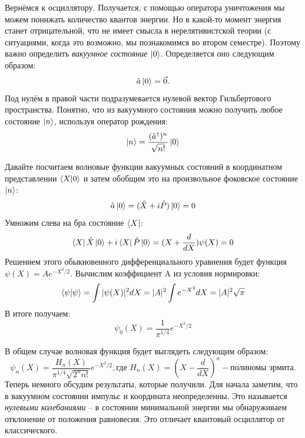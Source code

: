 Вернёмся к осциллятору. Получается, с помощью оператора уничтожения мы можем понижать количество квантов энергии. Но в какой-то момент энергия станет отрицательной, что не имеет смысла в нерелятивистской теории (с ситуациями, когда это возможно, мы познакомимся во втором семестре). Поэтому важно определить \textit{вакуумное состояние} $\ket{0}$. Определяется оно следующим образом:
\[
\hat{a}\ket{0} = \vec 0.
\]
Под нулём в правой части подразумевается нулевой вектор Гильбертового пространства. Понятно, что из вакуумного состояния можно получить любое состояние $\ket{n}$, используя оператор рождения:
\[
\ket{n} = \frac{(\hat{a}^{\dagger})^n}{\sqrt{n!}}\ket{0}
\]

Давайте посчитаем волновые функции вакуумных состояний в координатном представлении $\bra{X}\ket{0}$ и затем обобщим это на произвольное фоковское состояние $\ket{n}$:
\[
\hat{a}\ket{0} = (\hat{X} + i\hat{P})\ket{0} = 0
\]
Умножим слева на бра состояние $\bra{X}$:
\[
\bra{X}\hat{X}\ket{0} + i\bra{X}\hat{P}\ket{0} = (X + \frac{d}{dX})\psi(X) = 0
\]
Решением этого обыкновенного дифференциального уравнения будет функция $\psi(X) = Ae^{-X^2/2}$. Вычислим коэффициент A из условия нормировки:
\[
\braket{\psi} = \int |\psi(X)|^2 dX = |A|^2\int e^{-X^2}dX = |A|^2\sqrt{\pi}
\]
В итоге получаем:
\[
\psi_0(X) = \frac{1}{\pi^{1/4}}e^{-X^2/2}
\]

В общем случае волновая функция будет выглядеть следующим образом:
\[
\psi_n(X) = \frac{H_n(X)}{\pi^{1/4}\sqrt{2^n n!}}e^{-X^2/2}, \text{где } H_n(X) = (X - \frac{d}{dX})^n - \text{полиномы эрмита}.
\]
Теперь немного обсудим результаты, которые получили. Для начала заметим, что в вакуумном состоянии импульс и координата неопределенны. Это называется \textit{нулевыми колебаниями} – в состоянии минимальной энергии мы обнаруживаем отклонение от положения равновесия. Это отличает квантовый осциллятор от классического.

